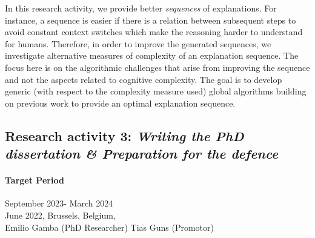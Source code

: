 \documentclass{article}
\begin{document}
	In this research activity, we provide better \emph{sequences} of explanations.
	For instance, a sequence is easier if there is a relation between subsequent steps to avoid constant context switches which make the reasoning harder to understand for humans. 
	Therefore, in order to improve the generated sequences, we investigate alternative measures of complexity of an explanation sequence.
	The focus  here is on the algorithmic challenges that arise from improving the sequence and not the aspects related to cognitive complexity. 
	The goal is to develop generic (with respect to the complexity measure used) global algorithms building on previous work to provide an optimal explanation sequence.
	
	
	
	\subsection{Research activity 3: \emph{Writing the PhD dissertation \& Preparation for the defence} }
	\paragraph{Target Period} September 2023- March 2024
	\vspace*{1cm} \\
	June 2022, Brussels, Belgium,\\
	Emilio Gamba (PhD Researcher) \hspace{1.5in} Tias Guns (Promotor)\\
	\vspace*{1cm} \\
	
	
	
\end{document}
